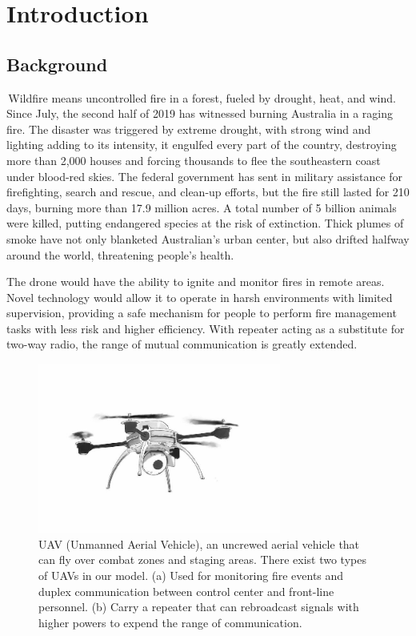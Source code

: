 \documentclass{mcmthesis}
\begin{document}
\maketitle

\tableofcontents 

\section{Introduction}
\subsection{Background}
\quad \,Wildfire means uncontrolled fire in a forest, fueled by drought, heat, and wind. Since July, the second half of 2019 has witnessed burning Australia in a raging fire. The disaster was triggered by extreme drought, with strong wind and lighting adding to its intensity, it engulfed every part of the country, destroying more than 2,000 houses and forcing thousands to flee the southeastern coast under blood-red skies. The federal government has sent in military assistance for firefighting, search and rescue, and clean-up efforts, but the fire still lasted for 210 days, burning more than 17.9 million acres. A total number of 5 billion animals were killed, putting endangered species at the risk of extinction. Thick plumes of smoke have not only blanketed Australian’s urban center, but also drifted halfway around the world, threatening people’s health.

The drone would have the ability to ignite and monitor fires in remote areas. Novel technology would allow it to operate in harsh environments with limited supervision, providing a safe mechanism for people to perform fire management tasks with less risk and higher efficiency. With repeater acting as a substitute for two-way radio, the range of mutual communication is greatly extended.

\begin{figure}[h]
	\small
	\centering
	\includegraphics[width=8cm]{Figure/UAV.png}
	\caption{UAV (Unmanned Aerial Vehicle), an uncrewed aerial vehicle that can fly over combat zones and staging areas. There exist two types of UAVs in our model. 
	(a) Used for monitoring fire events and duplex communication between control center and front-line personnel.  
	(b) Carry a repeater that can rebroadcast signals with higher powers to expend the range of communication.} \label{fig:UAV}
\end{figure}
\end{document}
